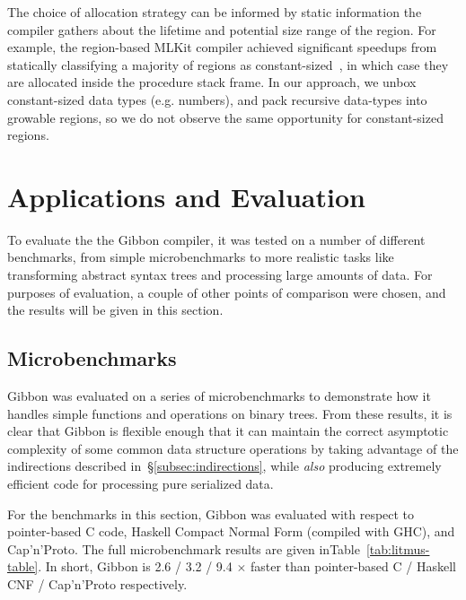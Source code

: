 \documentclass[showabstract,showacknowledgments,showpreface,showdedication,school]{iuphd}
\theoremstyle{nonumberplain}
\newcommand{\secref}[1]{\S\ref{#1}}
\newcommand{\tabref}[1]{Table~\ref{#1}}
\begin{document}
The choice of allocation strategy can be informed by static information the
compiler gathers about the lifetime and potential size range of the region. For
example, the region-based MLKit compiler achieved significant speedups from
statically classifying a majority of regions as
constant-sized~\cite{mlkit-retrospective}, in which case they are allocated
inside the procedure stack frame.
In our approach, we unbox constant-sized data types (e.g. numbers), and
pack recursive data-types into growable regions, so we do not observe the same
opportunity for constant-sized regions.





\section{Applications and Evaluation}
\label{section:applications}

To evaluate the the Gibbon compiler, it was tested on a number of different
benchmarks, from simple microbenchmarks to more realistic tasks like
transforming abstract syntax trees and processing large amounts of data.
For purposes of evaluation, a couple of other points of comparison were
chosen, and the results will be given in this section.

\subsection{Microbenchmarks}\label{subsec:microbenchmarks}

Gibbon was evaluated on a series of microbenchmarks to demonstrate how it
handles simple functions and operations on binary trees. From these results,
it is clear that Gibbon is flexible enough that it can maintain the
correct asymptotic complexity of some common data structure operations by
taking advantage of the indirections described in~\secref{subsec:indirections},
while \emph{also} producing extremely efficient code for processing
pure serialized data.

For the benchmarks in this section, Gibbon was evaluated with respect to
pointer-based C code, Haskell Compact Normal Form (compiled with GHC),
and Cap'n'Proto.
The full microbenchmark results are given in\tabref{tab:litmus-table}. In short,
Gibbon is 2.6 / 3.2 / 9.4 $\times$ faster than pointer-based C / Haskell CNF /
Cap'n'Proto respectively.
\end{document}
